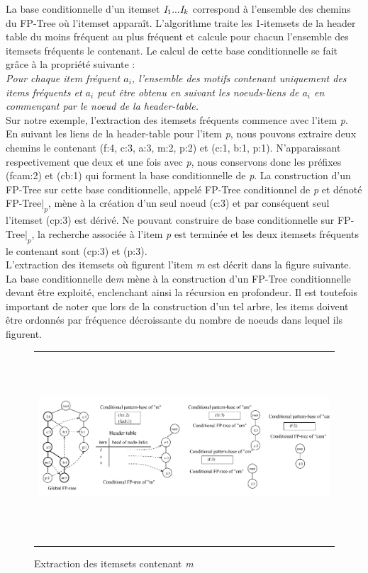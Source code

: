 \documentclass[a4paper,10pt]{report}
\begin{document}
La base conditionnelle d'un itemset $\emph{I}_{1}...\emph{I}_{k}$ correspond à l'ensemble des chemins du FP-Tree où l'itemset apparaît. L'algorithme traite les 1-itemsets de la header table du moins fréquent au plus fréquent et calcule pour chacun l'ensemble des itemsets fréquents le contenant. Le calcul de cette base conditionnelle se fait grâce à  la propriété suivante : \\

\emph{Pour chaque item fréquent $a_{i}$, l'ensemble des motifs contenant uniquement des items fréquents et $a_{i}$ peut être obtenu en suivant les noeuds-liens de $a_{i}$ en commençant par le noeud de la header-table.} \\

Sur notre exemple, l'extraction des itemsets fréquents commence avec l'item \emph{p}. En suivant les liens de la header-table pour l'item \emph{p}, nous pouvons extraire deux chemins le contenant (f:4, c:3, a:3, m:2, p:2) et (c:1, b:1, p:1). N'apparaissant respectivement que deux et une fois avec \emph{p}, nous conservons donc les préfixes (fcam:2) et (cb:1) qui forment la base conditionnelle de \emph{p}. La construction d'un FP-Tree sur cette base conditionnelle, appelé FP-Tree conditionnel de \emph{p} et dénoté FP-Tree$|_{p}$, mène à la création d'un seul noeud (c:3) et par conséquent  seul l'itemset (cp:3) est dérivé. Ne pouvant construire de base conditionnelle sur FP-Tree$|_{p}$, la recherche associée à l'item \emph{p} est terminée et les deux itemsets fréquents le contenant sont (cp:3) et (p:3). \\
L'extraction des itemsets où figurent l'item \emph{m} est décrit dans la figure suivante. La base conditionnelle de\emph{m} mène à la construction d'un FP-Tree conditionnelle devant être exploité, enclenchant ainsi la récursion en profondeur. Il est toutefois important de noter que lors de la construction d'un tel arbre, les items doivent être ordonnés par fréquence décroissante du nombre de noeuds dans lequel ils figurent.

\begin{figure}
	\begin{adjustwidth}{-1cm}{}
	\begin{tabular}{l}
	\includegraphics[width=15cm,height=7cm]{./img/mining_m.jpg}\\
	\end{tabular}
	\caption{\label{fig:text}Extraction des itemsets contenant \emph{m}}
	\end{adjustwidth}
\end{figure}
\end{document}
